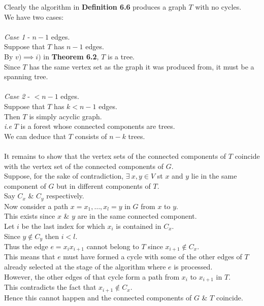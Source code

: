 \documentclass[11pt,a4paper]{article}
\begin{document}
Clearly the algorithm in \textbf{Definition 6.6} produces a graph $T$ with no cycles.\\
We have two cases:\\
\\
\textit{Case 1} - $n-1$ edges.\\
Suppose that $T$ has $n-1$ edges.\\
By $v)\implies i)$ in \textbf{Theorem 6.2}, $T$ is a tree.\\
Since $T$ has the same vertex set as the graph it was produced from, it must be a spanning tree.\\
\\
\textit{Case 2} - $<n-1$ edges.\\
Suppose that $T$ has $k<n-1$ edges.\\
Then $T$ is simply acyclic graph.\\
\textit{i.e} $T$ is a forest whose connected components are trees.\\
We can deduce that $T$ consists of $n-k$ trees.\\
\\
It remains to show that the vertex sets of the connected components of $T$ coincide with the vertex set of the connected components of $G$.\\
Suppose, for the sake of contradiction, $\exists\ x,y\in V$ st $x$ and $y$ lie in the same component of $G$ but in different components of $T$.\\
Say $C_x$ \& $C_y$ respectively.\\
Now consider a path $x=x_1,\dots,x_l=y$ in $G$ from $x$ to $y$.\\
This exists since $x$ \& $y$ are in the same connected component.\\
Let $i$ be the last index for which $x_i$ is contained in $C_x$.\\
Since $y\not\in C_y$ then $i<l$.\\
Thus the edge $e=x_ix_{i+1}$ cannot belong to $T$ since $x_{i+1}\not\in C_x$.\\
This means that $e$ must have formed a cycle with some of the other edges of $T$ already selected at the stage of the algorithm where $e$ is processed.\\
However, the other edges of that cycle form a path from $x_i$ to $x_{i+1}$ in $T$.\\
This contradicts the fact that $x_{i+1}\not\in C_x$.\\
Hence this cannot happen and the connected components of $G$ \& $T$ coincide.\\
\end{document}
